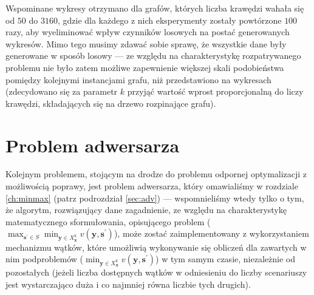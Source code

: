 Wspominane wykresy otrzymano dla grafów, których liczba krawędzi wahała się od $50$ do $3160$, gdzie dla każdego z nich eksperymenty zostały powtórzone $100$ razy, aby wyeliminować wpływ czynników losowych na postać generowanych wykresów. Mimo tego musimy zdawać sobie sprawę, że wszystkie dane były generowane w sposób losowy --- ze względu na charakterystykę rozpatrywanego problemu nie było zatem możliwe zapewnienie większej skali podobieństwa pomiędzy kolejnymi instancjami grafu, niż przedstawiono na wykresach (zdecydowano się za parametr $k$ przyjąć wartość wprost proporcjonalną do liczy krawędzi, składających się na drzewo rozpinające grafu).

\section{Problem adwersarza}

Kolejnym problemem, stojącym na drodze do problemu odpornej optymalizacji z możliwością poprawy, jest problem adwersarza, który omawialiśmy w rozdziale \ref{ch:minmax} (patrz podrozdział \ref{sec:adv}) --- wspomnieliśmy wtedy tylko o tym, że algorytm, rozwiązujący dane zagadnienie, ze względu na charakterystykę matematycznego sformułowania, opisującego problem ($\max_{\textbf{s}^{\prime} \in S} \min_{\textbf{y} \in X^{k}_{\textbf{x}}} v \left( \textbf{y}, \textbf{s}^{\prime} \right)$), może zostać zaimplementowany z wykorzystaniem mechanizmu wątków, które umożliwią wykonywanie się obliczeń dla zawartych w nim podproblemów ($\min_{\textbf{y} \in X^{k}_{\textbf{x}}} v \left( \textbf{y}, \textbf{s}^{\prime} \right)$) w tym samym czasie, niezależnie od pozostałych (jeżeli liczba dostępnych wątków w odniesieniu do liczby scenariuszy jest wystarczająco duża i co najmniej równa liczbie tych drugich). 

